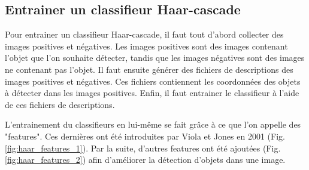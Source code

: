 \documentclass[11pt]{article}
\begin{document}
\subsection{Entrainer un classifieur Haar-cascade}
Pour entrainer un classifieur Haar-cascade, il faut tout d'abord collecter des images positives et négatives. Les images positives sont des images contenant l'objet que l'on souhaite détecter, tandis que les images négatives sont des images ne contenant pas l'objet. Il faut ensuite générer des fichiers de descriptions des images positives et négatives. Ces fichiers contiennent les coordonnées des objets à détecter dans les images positives. Enfin, il faut entrainer le classifieur à l'aide de ces fichiers de descriptions. \bigbreak

L'entrainement du classifieurs en lui-même se fait grâce à ce que l'on appelle des "features". Ces dernières ont été introduites par Viola et Jones en 2001 (Fig. \ref{fig:haar_features_1}). Par la suite, d'autres features ont été ajoutées (Fig. \ref{fig:haar_features_2}) afin d'améliorer la détection d'objets dans une image.
\bigbreak \bigbreak
\end{document}
